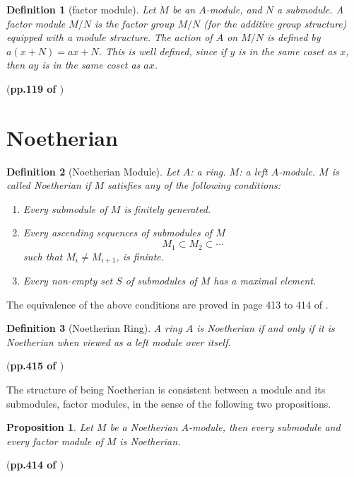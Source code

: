 \documentclass{article}
\numberwithin{equation}{subsection} %
\newtheorem{defi}{Definition}[section]
\newtheorem{prop}{Proposition}[section]
\theoremstyle{definition}
\begin{document}
\begin{defi}[factor module]
    Let $M$ be an $A$-module, and $N$ a submodule. 
    A factor module $M/N$ is the factor group $M/N$ (for the
    additive group structure) equipped with a module structure.
    The action of $A$ on $M/N$ is defined by $a(x+N) = ax+N$.
    This is well defined, since if $y$ is in the same coset as
    $x$, then $ay$ is in the same coset as $ax$.
\end{defi}
(\textbf{pp.119 of \cite{lang}})

\section{Noetherian}
\label{sec:Noetherian}
\begin{defi}[Noetherian Module]
    Let $A$: a ring. $M$: a left $A$-module. $M$ is called Noetherian
    if $M$ satisfies any of the following conditions:
    \begin{enumerate}
        \item Every submodule of $M$ is finitely generated.
        \item Every ascending sequences of submodules of $M$
            \[ M_1 \subset M_2 \subset \cdots \]
            such that $M_i \neq M_{i+1}$, is fininte.
        \item Every non-empty set $S$ of submodules of $M$ has a maximal
            element.
    \end{enumerate}
\end{defi}

The equivalence of the above conditions are proved in page 413 to 414 of 
\cite{lang}.

\begin{defi}[Noetherian Ring]
    A ring $A$ is Noetherian if and only if it is Noetherian when
    viewed as a left module over itself.
\end{defi}
(\textbf{pp.415 of \cite{lang}})

The structure of being Noetherian is consistent between a module
and its submodules, factor modules, in the sense of the 
following two propositions.

\begin{prop}
    Let $M$ be a Noetherian $A$-module, then every submodule and
    every factor module of $M$ is Noetherian.
\end{prop}
(\textbf{pp.414 of \cite{lang}})
\end{document}
